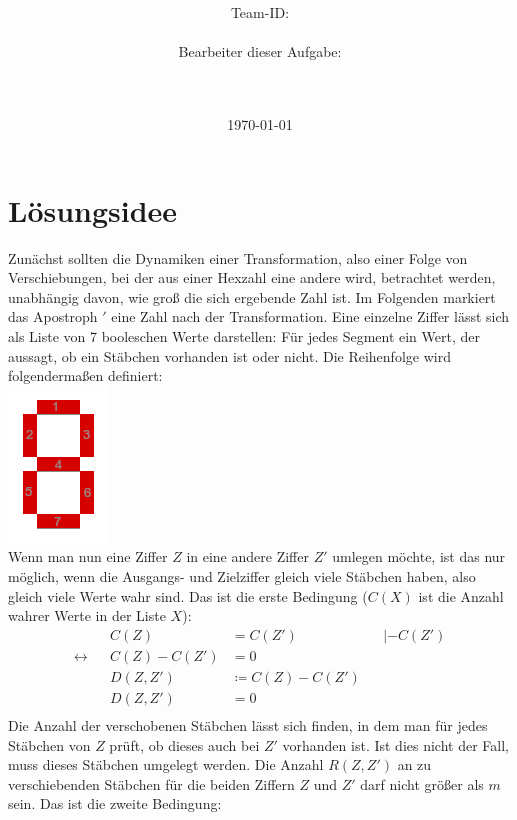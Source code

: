 \documentclass[a4paper,10pt,ngerman]{scrartcl}
\title{\textbf{\Huge\Aufgabe}}
\author{\LARGE Team-ID: \LARGE \TeamId \\\\
	    \LARGE Bearbeiter dieser Aufgabe: \\ 
	    \LARGE \Namen\\\\}
\date{\LARGE\today}
\begin{document}
\maketitle
\tableofcontents

\vspace{0.5cm}



\section{Lösungsidee}

Zunächst sollten die Dynamiken einer Transformation, also einer Folge von Verschiebungen, bei der aus einer Hexzahl eine andere wird, betrachtet werden, unabhängig davon, wie groß die sich ergebende Zahl ist. Im Folgenden markiert das Apostroph $'$ eine Zahl nach der Transformation. Eine einzelne Ziffer lässt sich als Liste von 7 booleschen Werte darstellen: Für jedes Segment ein Wert, der aussagt, ob ein Stäbchen vorhanden ist oder nicht. Die Reihenfolge wird folgendermaßen definiert: \\
\includegraphics[scale=4]{ziffereinzel} \\
 Wenn man nun eine Ziffer $Z$ in eine andere Ziffer $Z'$ umlegen möchte, ist das nur möglich, wenn die Ausgangs- und Zielziffer gleich viele Stäbchen haben, also gleich viele Werte wahr sind. Das ist die erste Bedingung ($C(X)$ ist die Anzahl wahrer Werte in der Liste $X$):
\begin{align}
&& C(Z) &= C(Z') && |-C(Z') \\
\leftrightarrow && C(Z) - C(Z') &= 0 && \\
&& D(Z, Z') &\coloneqq C(Z) - C(Z') && \\
&& D(Z, Z') &= 0 && \\
\end{align}
Die Anzahl der verschobenen Stäbchen lässt sich finden, in dem man für jedes Stäbchen von $Z$ prüft, ob dieses auch bei $Z'$ vorhanden ist. Ist dies nicht der Fall, muss dieses Stäbchen umgelegt werden. Die Anzahl $R(Z, Z')$ an zu verschiebenden Stäbchen für die beiden Ziffern $Z$ und $Z'$ darf nicht größer als $m$ sein. Das ist die zweite Bedingung: 
\end{document}
